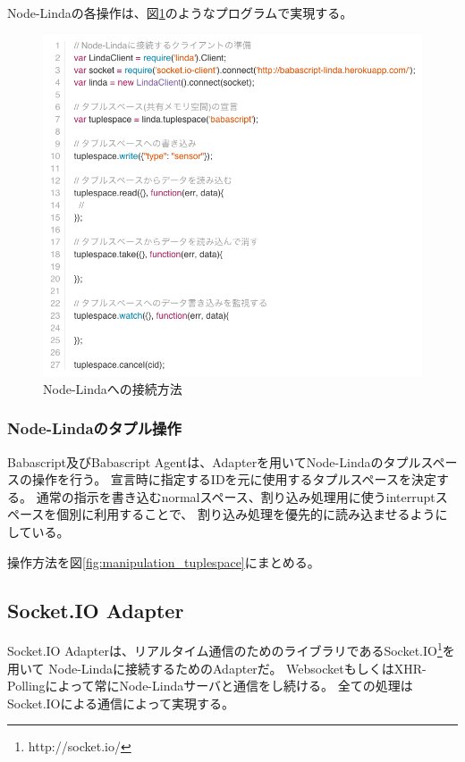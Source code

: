 Node-Lindaの各操作は、図\ref{fig:linda-usage}のようなプログラムで実現する。

\begin{figure}[htbp]
  \begin{center}
    \includegraphics[width=.7\linewidth,bb=0 0 770 695]{images/linda-usage.js.png}
  \end{center}
  \caption{Node-Lindaへの接続方法}
  \label{fig:linda-usage}
\end{figure}

\subsubsection{Node-Lindaのタプル操作}\label{node-lindaux306eux30bfux30d7ux30ebux64cdux4f5c}

Babascript及びBabascript
Agentは、Adapterを用いてNode-Lindaのタプルスペースの操作を行う。
宣言時に指定するIDを元に使用するタプルスペースを決定する。
通常の指示を書き込むnormalスペース、割り込み処理用に使うinterruptスペースを個別に利用することで、
割り込み処理を優先的に読み込ませるようにしている。

操作方法を図\ref{fig:manipulation_tuplespace}にまとめる。

\subsection{Socket.IO Adapter}\label{socket.io-adapter}

Socket.IO
Adapterは、リアルタイム通信のためのライブラリであるSocket.IO\footnote{http://socket.io/}を用いて
Node-Lindaに接続するためのAdapterだ。
WebsocketもしくはXHR-Pollingによって常にNode-Lindaサーバと通信をし続ける。
全ての処理はSocket.IOによる通信によって実現する。

